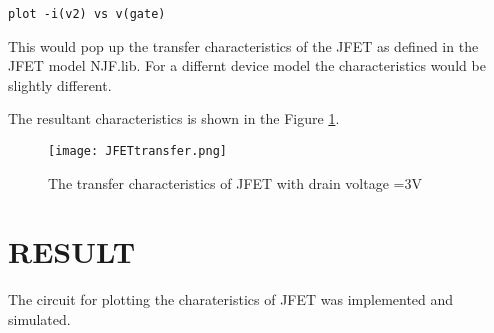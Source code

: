 \texttt{plot -i(v2) vs v(gate)}

This would pop up the transfer characteristics of the JFET as defined in the JFET model NJF.lib. For a differnt device model the characteristics would be slightly different.

The resultant characteristics is shown in the Figure \ref{JFETtransfer}.


\begin{figure}[h]
\centering
\texttt{[image: JFETtransfer.png]}
\caption{The transfer characteristics of JFET with drain voltage =3V }
\label{JFETtransfer}
\end{figure}


\section*{RESULT}
The circuit for plotting the charateristics of JFET was implemented and simulated.


